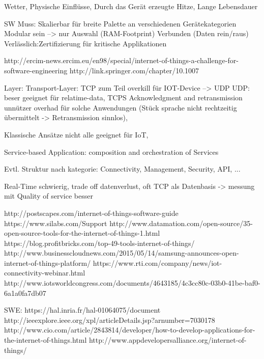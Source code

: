 Wetter, Physische Einflüsse, Durch das Gerät erzeugte Hitze, Lange Lebensdauer

SW Muss: Skalierbar für breite Palette an verschiedenen Gerätekategorien
Modular sein --> nur Auswahl (RAM-Footprint)
Verbunden (Daten rein/raus)
Verlässlich:Zertifizierung für kritische Applikationen


http://ercim-news.ercim.eu/en98/special/internet-of-things-a-challenge-for-software-engineering
http://link.springer.com/chapter/10.1007%

Layer: Transport-Layer: TCP zum Teil overkill für IOT-Device --> UDP
UDP: beser geeignet für relatime-data, TCPS Acknowledgment and retransmission unnützer overhad für solche Anwendungen (Stück sprache nicht rechtzeitig übermittelt -> Retransmission sinnlos), 


Klassische Ansätze nicht alle geeignet für IoT, 

Service-based Application: composition and orchestration of Services



Evtl. Struktur nach kategorie: Connectivity, Management, Security, API, ...

Real-Time schwierig, trade off datenverlust, oft TCP als Datenbasis -> messung mit Quality of service besser

http://postscapes.com/internet-of-things-software-guide
	https://www.silabs.com/Support%
http://www.datamation.com/open-source/35-open-source-tools-for-the-internet-of-things-1.html
https://blog.profitbricks.com/top-49-tools-internet-of-things/
http://www.businesscloudnews.com/2015/05/14/samsung-announces-open-internet-of-things-platform/
https://www.rti.com/company/news/iot-connectivity-webinar.html
http://www.iotsworldcongress.com/documents/4643185/4c3cc80c-03b0-41be-baf0-6a1a0fa7db07


SWE:
https://hal.inria.fr/hal-01064075/document
http://ieeexplore.ieee.org/xpl/articleDetails.jsp?arnumber=7030178
http://www.cio.com/article/2843814/developer/how-to-develop-applications-for-the-internet-of-things.html
http://www.appdevelopersalliance.org/internet-of-things/

